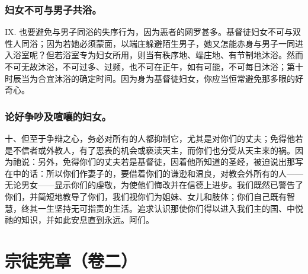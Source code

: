 
\subsubsection{妇女不可与男子共浴。}

IX. 也要避免与男子同浴的失序行为，因为恶者的网罗甚多。基督徒妇女不可与双性人同浴；因为若她必须蒙面，以端庄躲避陌生男子，她又怎能赤身与男子一同进入浴室呢？但若浴室专为妇女所用，则当有秩序地、端庄地、有节制地沐浴。然而不可无故沐浴，不可过多、过频，也不可在正午，如有可能，不可每日沐浴；第十时辰当为合宜沐浴的确定时间。因为身为基督徒妇女，你应当恒常避免那多眼的好奇心。\par


\subsubsection{论好争吵及喧嚷的妇女。}

十、但至于争辩之心，务必对所有的人都抑制它，尤其是对你们的丈夫；免得他若是不信者或外教人，有了恶表的机会或亵渎天主，而你们也分受从天主来的祸。因为祂说：另外，免得你们的丈夫若是基督徒，因着他所知道的圣经，被迫说出那写在中的话：所以你们作妻子的，要借着你们的谦逊和温良，对教会外所有的人——无论男女——显示你们的虔敬，为使他们悔改并在信德上进步。我们既然已警告了你们，并简短地教导了你们，我们视你们为姐妹、女儿和肢体；你们自己既有智慧，终其一生坚持无可指责的生活。追求认识那使你们得以进入我们主的国、中悦祂的知识，并如此安息直到永远。阿们。\par



\section{宗徒宪章（卷二）}

\par

